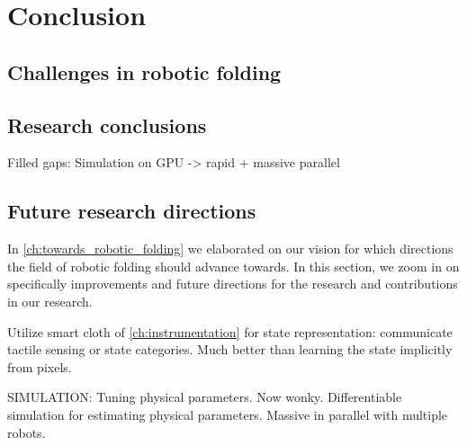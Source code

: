 \documentclass[\home/main.tex]{subfiles}
\begin{document}
\chapter{Conclusion}\label{ch:conclusion}

\section{Challenges in robotic folding}

\section{Research conclusions}
Filled gaps:
    Simulation on GPU -> rapid + massive parallel 


\section{Future research directions} \label{sec:conc_future_work}
In \cref{ch:towards_robotic_folding} we elaborated on our vision for which directions the field of robotic folding should advance towards. In this section, we zoom in on specifically improvements and future directions for the research and contributions in our research. 

Utilize smart cloth of \cref{ch:instrumentation} for state representation: communicate tactile sensing or state categories. Much better than learning the state implicitly from pixels. 



SIMULATION:
    Tuning physical parameters. Now wonky. Differentiable simulation for estimating physical parameters.
    Massive in parallel with multiple robots. 
\end{document}
